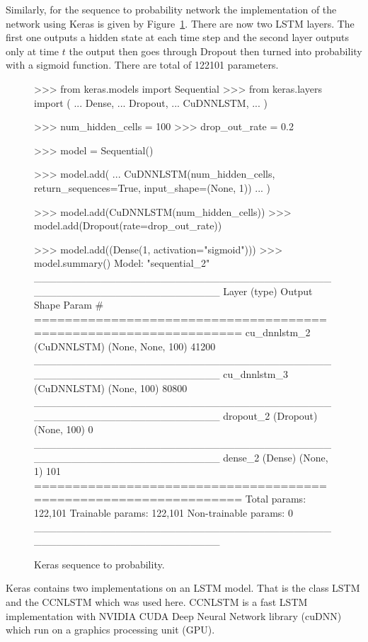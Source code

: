 Similarly, for the sequence to probability network the implementation of the
network using Keras is given by Figure~\ref{fig:keras_sequence_to_probability}.
There are now two LSTM layers. The first one outputs a hidden state at each time
step and the second layer outputs only at time \(t\) the output then goes
through Dropout then turned into probability with a sigmoid function. There are
total of 122101 parameters.

\begin{figure}[!htbp]
\begin{usagepy}
    >>> from keras.models import Sequential
>>> from keras.layers import (
...     Dense,
...     Dropout,
...     CuDNNLSTM,
... )

>>> num_hidden_cells = 100
>>> drop_out_rate = 0.2

>>> model = Sequential()

>>> model.add(
...     CuDNNLSTM(num_hidden_cells, return_sequences=True, input_shape=(None, 1))
... )

>>> model.add(CuDNNLSTM(num_hidden_cells))
>>> model.add(Dropout(rate=drop_out_rate))

>>> model.add((Dense(1, activation="sigmoid")))
>>> model.summary()
Model: "sequential_2"
_________________________________________________________________
Layer (type)                 Output Shape              Param #   
=================================================================
cu_dnnlstm_2 (CuDNNLSTM)     (None, None, 100)         41200     
_________________________________________________________________
cu_dnnlstm_3 (CuDNNLSTM)     (None, 100)               80800     
_________________________________________________________________
dropout_2 (Dropout)          (None, 100)               0         
_________________________________________________________________
dense_2 (Dense)              (None, 1)                 101       
=================================================================
Total params: 122,101
Trainable params: 122,101
Non-trainable params: 0
_________________________________________________________________

\end{usagepy}
\caption{Keras sequence to probability.}\label{fig:keras_sequence_to_probability}
\end{figure}

Keras contains two implementations on an LSTM model. That is the class LSTM and
the CCNLSTM which was used here. CCNLSTM is a fast  LSTM implementation with
NVIDIA CUDA Deep Neural Network library (cuDNN) which run on a graphics
processing unit (GPU).

